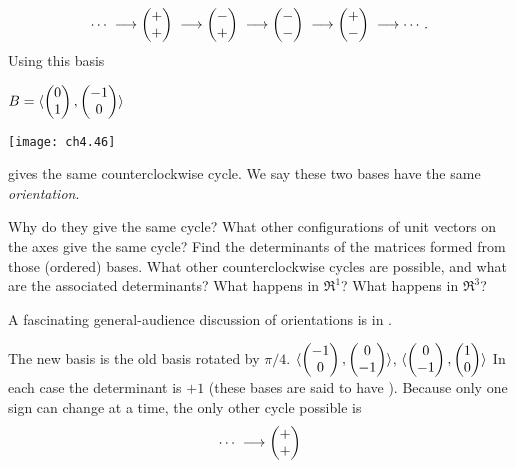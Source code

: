 \begin{exercises}
    {\scriptsize
    \begin{equation*}
       \cdots
       \;\longrightarrow\begin{pmatrix} + \\ + \end{pmatrix}
       \;\longrightarrow\begin{pmatrix} - \\ + \end{pmatrix}
       \;\longrightarrow\begin{pmatrix} - \\ - \end{pmatrix}
       \;\longrightarrow\begin{pmatrix} + \\ - \end{pmatrix}
       \;\longrightarrow\cdots\,.
    \end{equation*} }
    Using this basis
    \begin{center}
      \( B=\langle\begin{pmatrix} 0 \\ 1 \end{pmatrix},\begin{pmatrix} -1 \\ 0 \end{pmatrix}\rangle \)
      \qquad
      \parbox{.75in}{\hbox{}\hfil\texttt{[image: ch4.46]}\hfil\hbox{}}
    \end{center}
    gives the same counterclockwise cycle.
    We say these two bases have the same \emph{orientation}.
    \begin{exparts}
      \partsitem Why do they give the same cycle?
      \partsitem What other configurations of unit vectors on the axes give the
        same cycle?
      \partsitem Find the determinants of the matrices formed from 
        those (ordered) bases.
      \partsitem What other counterclockwise cycles are possible, 
        and what are the
        associated determinants?
      \partsitem What happens in \( \Re^1 \)?
      \partsitem What happens in \( \Re^3 \)?
    \end{exparts}
    A fascinating general-audience
    discussion of orientations is in \cite{Gardner}.
    \begin{answer}
      \begin{exparts}
        \partsitem The new basis is the old basis rotated by \( \pi/4 \).
        \partsitem 
          $
             \langle\begin{pmatrix} -1 \\ 0 \end{pmatrix},
                       \begin{pmatrix} 0 \\ -1 \end{pmatrix}\rangle
          $, $
             \langle\begin{pmatrix} 0 \\ -1 \end{pmatrix},
                       \begin{pmatrix} 1 \\ 0 \end{pmatrix}\rangle
          $
        \partsitem In each case the determinant is \( +1 \) 
          (these bases are said to
          have ).
        \partsitem Because only one sign can change at a time, the only other
          cycle possible is
          \begin{equation*}
             \cdots
             \;\longrightarrow\colvec{+ \\ +}

\end{equation*}
\end{exparts}
\end{answer}
\end{exercises}
